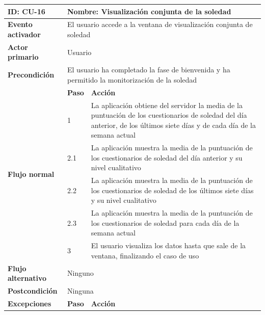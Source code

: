             \begin{table}[h]
                \centering
                \begin{tabularx}{\textwidth}{|l|l|X|}
                    \hline
                    \textbf{ID:} CU-16 & \multicolumn{2}{|X|}{\textbf{Nombre}: Visualización conjunta de la soledad} \\
                    \hline
                    \textbf{Evento activador} & \multicolumn{2}{|X|}{El usuario accede a la ventana de visualización conjunta de soledad} \\
                    \hline
                    \textbf{Actor primario} & \multicolumn{2}{|X|}{Usuario} \\
                    \hline
                    \textbf{Precondición} & \multicolumn{2}{|X|}{El usuario ha completado la fase de bienvenida y ha permitido la monitorización de la soledad} \\
                    \hline
                    \multirow{6}{*}{\textbf{Flujo normal}} & \textbf{Paso} & \textbf{Acción} \\
                    \cline{2-3} & 1 & La aplicación obtiene del servidor la media de la puntuación de los cuestionarios de soledad del día anterior, de los últimos siete días y de cada día de la semana actual \\
                    \cline{2-3} & 2.1 & La aplicación muestra la media de la puntuación de los cuestionarios de soledad del día anterior y su nivel cualitativo \\
                    \cline{2-3} & 2.2 & La aplicación muestra la media de la puntuación de los cuestionarios de soledad de los últimos siete días y su nivel cualitativo \\
                    \cline{2-3} & 2.3 & La aplicación muestra la media de la puntuación de los cuestionarios de soledad para cada día de la semana actual \\
                    \cline{2-3} & 3 & El usuario visualiza los datos hasta que sale de la ventana, finalizando el caso de uso \\
                    \hline
                    \textbf{Flujo alternativo} & \multicolumn{2}{|X|}{Ninguno} \\
                    \hline
                    \textbf{Postcondición} & \multicolumn{2}{|X|}{Ninguna} \\
                    \hline
                    \multirow{4}{*}{\textbf{Excepciones}}  & \textbf{Paso} & \textbf{Acción} \\

\end{tabularx}
\end{table}

